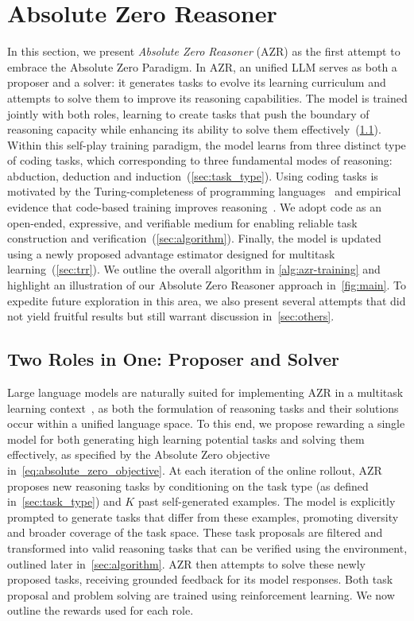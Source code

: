 \documentclass{article}
\begin{document}
\section{Absolute Zero Reasoner}
In this section, we present \emph{Absolute Zero Reasoner} (AZR) as the first attempt to embrace the Absolute Zero Paradigm. In AZR, an unified LLM serves as both a proposer and a solver: it generates tasks to evolve its learning curriculum and attempts to solve them to improve its reasoning capabilities. The model is trained jointly with both roles, learning to create tasks that push the boundary of reasoning capacity while enhancing its ability to solve them effectively~(\cref{sec:roles}). Within this self-play training paradigm, the model learns from three distinct type of coding tasks, which corresponding to  three fundamental modes of reasoning: abduction, deduction and induction~(\cref{sec:task_type}). Using coding tasks is motivated by the Turing-completeness of programming languages~\citep{stuart2013understanding} and empirical evidence that code-based training improves reasoning~\citep{aryabumi2024code}. We adopt code as an open-ended, expressive, and verifiable medium for enabling reliable task construction and verification~(\cref{sec:algorithm}). Finally, the model is updated using a newly proposed advantage estimator designed for multitask learning~(\cref{sec:trr}). We outline the overall algorithm in \cref{alg:azr-training} and highlight an illustration of our Absolute Zero Reasoner approach in~\cref{fig:main}. To expedite future exploration in this area, we also present several attempts that did not yield fruitful results but still warrant discussion in~\cref{sec:others}.


\subsection{Two Roles in One: Proposer and Solver}
\label{sec:roles}
Large language models are naturally suited for implementing AZR in a multitask learning context~\citep{radford2019language}, as both the formulation of reasoning tasks and their solutions occur within a unified language space. To this end, we propose rewarding a single model for both generating high learning potential tasks and solving them effectively, as specified by the Absolute Zero objective in~\cref{eq:absolute_zero_objective}. At each iteration of the online rollout, AZR proposes new reasoning tasks by conditioning on the task type (as defined in~\cref{sec:task_type}) and $K$ past self-generated examples. The model is explicitly prompted to generate tasks that differ from these examples, promoting diversity and broader coverage of the task space. These task proposals are filtered and transformed into valid reasoning tasks that can be verified using the environment, outlined later in~\cref{sec:algorithm}. AZR then attempts to solve these newly proposed tasks, receiving grounded feedback for its model responses. Both task proposal and problem solving are trained using reinforcement learning. We now outline the rewards used for each role.
\end{document}
